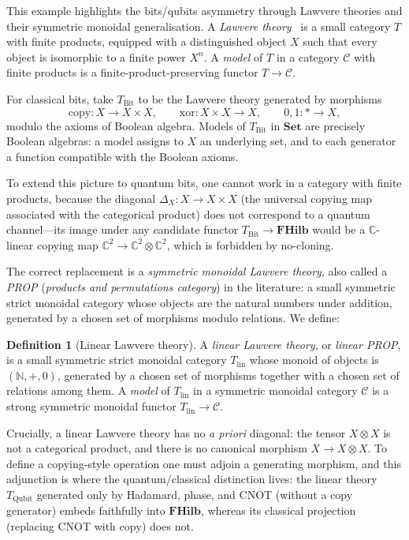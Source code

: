 \documentclass[12pt]{article}
\theoremstyle{definition}
\newtheorem{definition}[theorem]{Definition}
\theoremstyle{remark}
\newcommand{\C}{\mathcal{C}}
\newcommand{\FHilb}{\mathbf{FHilb}}
\newcommand{\Set}{\mathbf{Set}}
\begin{document}
This example highlights the bits/qubits asymmetry through Lawvere theories and their symmetric monoidal generalisation. A \emph{Lawvere theory}~\cite{lawvere1963} is a small category $T$ with finite products, equipped with a distinguished object $X$ such that every object is isomorphic to a finite power $X^n$. A \emph{model} of $T$ in a category $\C$ with finite products is a finite-product-preserving functor $T \to \C$.

For classical bits, take $T_{\mathrm{Bit}}$ to be the Lawvere theory generated by morphisms
\[
\mathrm{copy} : X \to X \times X,\qquad \mathrm{xor} : X \times X \to X,\qquad 0, 1 : * \to X,
\]
modulo the axioms of Boolean algebra. Models of $T_{\mathrm{Bit}}$ in $\Set$ are precisely Boolean algebras: a model assigns to $X$ an underlying set, and to each generator a function compatible with the Boolean axioms.

To extend this picture to quantum bits, one cannot work in a category with finite products, because the diagonal $\Delta_X : X \to X \times X$ (the universal copying map associated with the categorical product) does not correspond to a quantum channel---its image under any candidate functor $T_{\mathrm{Bit}} \to \FHilb$ would be a $\mathbb{C}$-linear copying map $\mathbb{C}^2 \to \mathbb{C}^2 \otimes \mathbb{C}^2$, which is forbidden by no-cloning.

The correct replacement is a \emph{symmetric monoidal Lawvere theory}, also called a \emph{PROP} (\emph{products and permutations category}) in the literature: a small symmetric strict monoidal category whose objects are the natural numbers under addition, generated by a chosen set of morphisms modulo relations. We define:

\begin{definition}[Linear Lawvere theory]
\label{def:linear-lawvere}
A \emph{linear Lawvere theory}, or \emph{linear PROP}, is a small symmetric strict monoidal category $T_\mathrm{lin}$ whose monoid of objects is $(\mathbb{N}, +, 0)$, generated by a chosen set of morphisms together with a chosen set of relations among them. A \emph{model} of $T_\mathrm{lin}$ in a symmetric monoidal category $\C$ is a strong symmetric monoidal functor $T_\mathrm{lin} \to \C$.
\end{definition}

Crucially, a linear Lawvere theory has no \emph{a priori} diagonal: the tensor $X \otimes X$ is not a categorical product, and there is no canonical morphism $X \to X \otimes X$. To define a copying-style operation one must adjoin a generating morphism, and this adjunction is where the quantum/classical distinction lives: the linear theory $T_{\mathrm{Qubit}}$ generated only by Hadamard, phase, and CNOT (without a copy generator) embeds faithfully into $\FHilb$, whereas its classical projection (replacing CNOT with $\mathrm{copy}$) does not.
\end{document}
